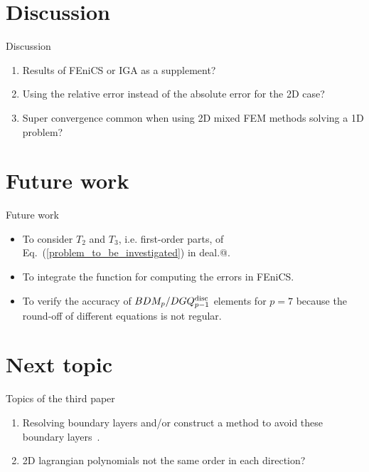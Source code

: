 \documentclass{beamer}
\makeatletter
\newcommand*{\rom}[1]{\expandafter\@slowromancap\romannumeral #1@}
\makeatother
\begin{document}
\section{Discussion}
\begin{frame}{Discussion}
\vspace{-9em}
\begin{enumerate}
 \item Results of FEniCS or IGA as a supplement?
 \item Using the relative error instead of the absolute error for the 2D case? 
 \item Super convergence common when using 2D mixed FEM methods solving a 1D problem?
\end{enumerate}
\end{frame}


\section{Future work}
\begin{frame}{Future work}
\vspace{-10em}
\begin{itemize}
 \item To consider $T_2$ and $T_3$, i.e. first-order parts, of Eq.~(\ref{problem_to_be_investigated}) in deal.\rom{2}.
 \item To integrate the function for computing the errors in FEniCS.
 \item To verify the accuracy of $BDM_p/DGQ_{p-1}^{\rm disc}$ elements for $p=7$ because the round-off of different equations is not regular.
\end{itemize}
\end{frame}

\section{Next topic}
\begin{frame}{Topics of the third paper}
\vspace{-11em}
\begin{enumerate}
 \item Resolving boundary layers and/or construct a method to avoid these boundary layers~\cite{kumar2016three}.
 \item 2D lagrangian polynomials not the same order in each direction?
\end{enumerate}
\end{frame}



\end{document}
